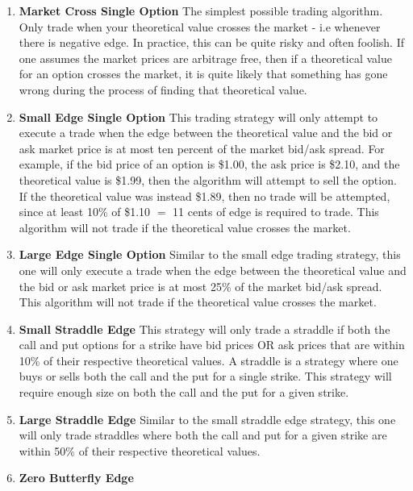 \documentclass[12pt, a4paper, notitlepage]{article}
\numberwithin{equation}{subsection}
\numberwithin{figure}{subsection}
\numberwithin{table}{subsection}
\begin{document}
\begin{enumerate}
	\item \textbf{Market Cross Single Option} \newline
        The simplest possible trading algorithm.  Only trade when your theoretical value crosses the market - i.e whenever there is negative edge.  In practice, this can be quite risky and often foolish.  If one assumes the market prices are arbitrage free, then if a theoretical value for an option crosses the market, it is quite likely that something has gone wrong during the process of finding that theoretical value.
	\item \textbf{Small Edge Single Option} \newline
    	This trading strategy will only attempt to execute a trade when the edge between the theoretical value and the bid or ask market price is at most ten percent of the market bid/ask spread.  For example, if the bid price of an option is \$1.00, the ask price is \$2.10, and the theoretical value is \$1.99, then the algorithm will attempt to sell the option.  If the theoretical value was instead \$1.89, then no trade will be attempted, since at least 10\% of \$1.10 $=$ 11 cents of edge is required to trade.  This algorithm will not trade if the theoretical value crosses the market.
	\item \textbf{Large Edge Single Option} \newline
    	Similar to the small edge trading strategy, this one will only execute a trade when the edge between the theoretical value and the bid or ask market price is at most 25\% of the market bid/ask spread.  This algorithm will not trade if the theoretical value crosses the market.
    \item \textbf{Small Straddle Edge} \newline
        This strategy will only trade a straddle if both the call and put options for a strike have bid prices OR ask prices that are within 10\% of their respective theoretical values.  A straddle is a strategy where one buys or sells both the call and the put for a single strike.  This strategy will require enough size on both the call and the put for a given strike.
    \item \textbf{Large Straddle Edge} \newline
        Similar to the small straddle edge strategy, this one will only trade straddles where both the call and put for a given strike are within 50\% of their respective theoretical values.
    \item \textbf{Zero Butterfly Edge} \newline

\end{enumerate}
\end{document}
